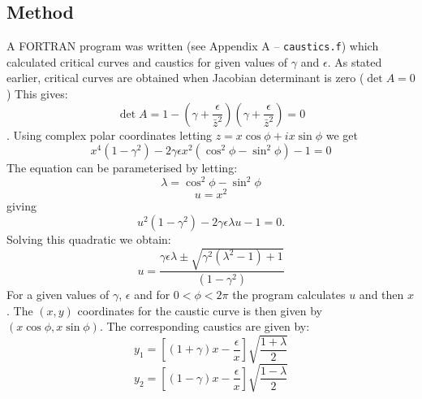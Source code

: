 \documentclass[aspectratio=1610,xcolor=dvipsnames,t]{beamer}
\begin{document}
    \subsection{Method}
    A FORTRAN program was written (see Appendix A -- \texttt{caustics.f})
    which calculated critical curves and caustics for given
    values of $\gamma$ and $\epsilon$. As stated earlier, critical
    curves are obtained when Jacobian determinant is zero ($\det A = 0$)
    This gives:
    \begin{equation}
        \det A = 1 - \left( \gamma + \frac{\epsilon}{\bar{z}^2} \right)
                     \left( \gamma + \frac{\epsilon}{\bar{z}^2} \right) = 0
    \end{equation}.
    Using complex polar coordinates letting $z = x \cos \phi + ix \sin \phi$
    we get
    \begin{equation}
        x^4 (1 - \gamma^2) - 2 \gamma \epsilon x^2 
            (\cos^2\phi - \sin^2\phi) - 1 = 0
    \end{equation}
    The equation can be parameterised by letting:
        \[ \lambda = \cos^2\phi - \sin^2\phi \]
        \[ u = x^2 \]
    giving
    \begin{equation}
        u^2(1 - \gamma^2) - 2\gamma \epsilon \lambda u - 1 = 0.
    \end{equation}
    Solving this quadratic we obtain:
    \begin{equation}
        u = \frac{\gamma\epsilon\lambda \pm \sqrt{\gamma^2(\lambda^2 - 1) + 1}}
                 {(1 - \gamma^2)}
    \end{equation}
    For a given values of $\gamma$, $\epsilon$ and for $0 < \phi < 2\pi$
    the program calculates $u$ and then $x$. The $(x,y)$ coordinates
    for the caustic curve is then given by $(x\cos\phi, x\sin\phi)$.
    The corresponding caustics are given by:
    \begin{equation}
        y_1 = \left[ (1 + \gamma)x - \frac{\epsilon}{x} \right] 
              \sqrt{\frac{1 + \lambda}{2} } 
    \end{equation}
    \begin{equation}
       y_2 = \left[ (1 - \gamma)x - \frac{\epsilon}{x} \right] 
                     \sqrt{\frac{1 - \lambda}{2} }
    \end{equation}
\end{document}
